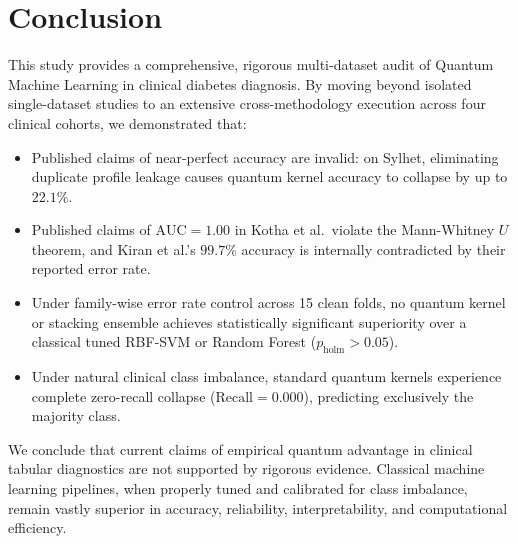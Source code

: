 \documentclass[journal,twocolumn]{IEEEtran}
\begin{document}
\section{Conclusion}
\label{sec:conclusion}
This study provides a comprehensive, rigorous multi-dataset audit of Quantum Machine Learning in clinical diabetes diagnosis. By moving beyond isolated single-dataset studies to an extensive cross-methodology execution across four clinical cohorts, we demonstrated that:
\begin{itemize}
    \item Published claims of near-perfect accuracy are invalid: on Sylhet, eliminating duplicate profile leakage causes quantum kernel accuracy to collapse by up to $22.1\%$.
    \item Published claims of $\text{AUC}=1.00$ in Kotha et al.\ violate the Mann-Whitney $U$ theorem, and Kiran et al.'s $99.7\%$ accuracy is internally contradicted by their reported error rate.
    \item Under family-wise error rate control across 15 clean folds, no quantum kernel or stacking ensemble achieves statistically significant superiority over a classical tuned RBF-SVM or Random Forest ($p_{\text{holm}} > 0.05$).
    \item Under natural clinical class imbalance, standard quantum kernels experience complete zero-recall collapse ($\text{Recall} = 0.000$), predicting exclusively the majority class.
\end{itemize}
We conclude that current claims of empirical quantum advantage in clinical tabular diagnostics are not supported by rigorous evidence. Classical machine learning pipelines, when properly tuned and calibrated for class imbalance, remain vastly superior in accuracy, reliability, interpretability, and computational efficiency.
\end{document}
